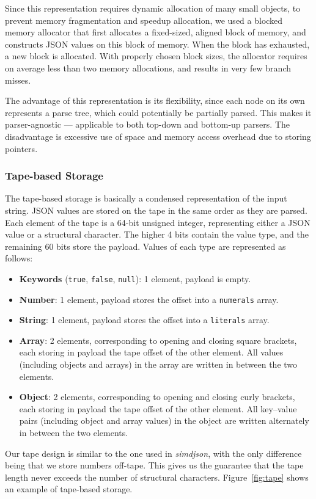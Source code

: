 \documentclass[11pt]{article}
\begin{document}
Since this representation requires dynamic allocation of many small objects, to prevent memory fragmentation and speedup allocation, we used a blocked memory allocator that first allocates a fixed-sized, aligned block of memory, and constructs JSON values on this block of memory. When the block has exhausted, a new block is allocated. With properly chosen block sizes, the allocator requires on average less than two memory allocations, and results in very few branch misses.

The advantage of this representation is its flexibility, since each node on its own represents a parse tree, which could potentially be partially parsed. This makes it parser-agnostic --- applicable to both top-down and bottom-up parsers. The disadvantage is excessive use of space and memory access overhead due to storing pointers.

\subsubsection{Tape-based Storage}
\label{sec:storage:tape}

The tape-based storage is basically a condensed representation of the input string. JSON values are stored on the tape in the same order as they are parsed. Each element of the tape is a 64-bit unsigned integer, representing either a JSON value or a structural character. The higher 4 bits contain the value type, and the remaining 60 bits store the payload. Values of each type are represented as follows:
\begin{itemize}
  \item \textbf{Keywords} (\texttt{true}, \texttt{false}, \texttt{null}): 1 element, payload is empty.
  \item \textbf{Number}: 1 element, payload stores the offset into a \texttt{numerals} array.
  \item \textbf{String}: 1 element, payload stores the offset into a \texttt{literals} array.
  \item \textbf{Array}: 2 elements, corresponding to opening and closing square brackets, each storing in payload the tape offset of the other element. All values (including objects and arrays) in the array are written in between the two elements.
  \item \textbf{Object}: 2 elements, corresponding to opening and closing curly brackets, each storing in payload the tape offset of the other element. All key--value pairs (including object and array values) in the object are written alternately in between the two elements.
\end{itemize}
Our tape design is similar to the one used in \textit{simdjson}, with the only difference being that we store numbers off-tape. This gives us the guarantee that the tape length never exceeds the number of structural characters. Figure~\ref{fig:tape} shows an example of tape-based storage.
\end{document}
